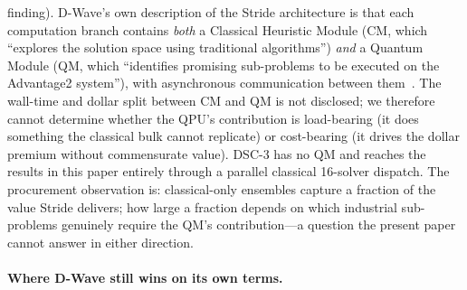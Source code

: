 \documentclass[11pt,a4paper]{article}
\begin{document}
\begin{enumerate}
{  finding).} D-Wave's own description of the Stride architecture is
  that each computation branch contains \emph{both} a Classical
  Heuristic Module (CM, which ``explores the solution space using
  traditional algorithms'') \emph{and} a Quantum Module (QM, which
  ``identifies promising sub-problems to be executed on the
  Advantage2 system''), with asynchronous communication between
  them~\cite{booth_stride_2024}. The wall-time and dollar split
  between CM and QM is not disclosed; we therefore cannot determine
  whether the QPU's contribution is load-bearing (it does
  something the classical bulk cannot replicate) or cost-bearing
  (it drives the dollar premium without commensurate value). DSC-3
  has no QM and reaches the results in this paper entirely through a
  parallel classical 16-solver dispatch. The procurement observation
  is: classical-only ensembles capture a fraction of the value Stride
  delivers; how large a fraction depends on which industrial
  sub-problems genuinely require the QM's contribution---a question
  the present paper cannot answer in either direction.
\end{enumerate}

\paragraph{Where D-Wave still wins on its own terms.}
\end{document}
